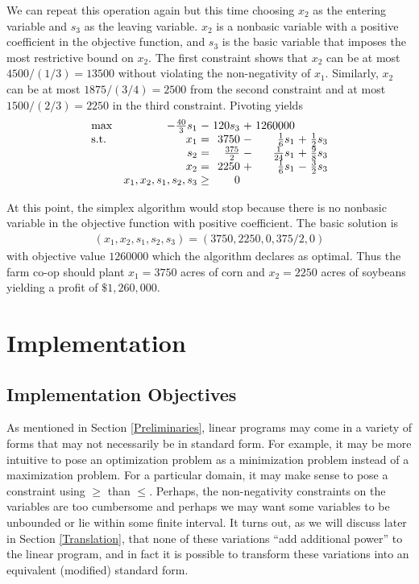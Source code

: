 \documentclass{article}
\begin{document}
We can repeat this operation again but this time choosing $x_2$ as the entering variable and $s_3$ as the leaving variable. $x_2$ is a nonbasic variable with a positive coefficient in the objective function, and $s_3$ is the basic variable that imposes the most restrictive bound on $x_2$. The first constraint shows that $x_2$ can be at most $4500 / (1/3) = 13500$ without violating the non-negativity of $x_1$. Similarly, $x_2$ can be at most $1875 / (3/4) = 2500$ from the second constraint and at most $1500 / (2/3) = 2250$ in the third constraint. Pivoting yields
\begin{equation*}
\setlength\arraycolsep{1.5pt}
  \begin{array}{l@{\quad} r c r c r c r}
    \max          & -\frac{40}{3}s_1 & - &         120 s_3 &    +  & 1260000    \\
    \mathrm{s.t.} & x_1 & = & 3750 & - & \frac{1}{6} s_1 & + & \frac{1}{2}s_3 \\
    & s_2 & = & \frac{375}{2} & - & \frac{1}{24}s_1 & + & \frac{9}{8} s_3 \\
    & x_2 & = & 2250 & + & \frac{1}{6}s_1 & - & \frac{3}{2}s_3 \\
    & x_1, x_2, s_1, s_2, s_3 & \geq & 0 &&&&  \\
  \end{array}
\end{equation*}

At this point, the simplex algorithm would stop because there is no nonbasic variable in the objective function with positive coefficient. The basic solution is
\begin{align*}
    (x_1, x_2, s_1, s_2, s_3) = (3750, 2250, 0, 375/2, 0)
\end{align*}
with objective value $1260000$ which the algorithm declares as optimal. Thus the farm co-op should plant $x_1 = 3750$ acres of corn and $x_2 = 2250$ acres of soybeans yielding a profit of $\$1,260,000$.

\section{Implementation} \label{Implementation}
\subsection{Implementation Objectives}
As mentioned in Section \ref{Preliminaries}, linear programs may come in a variety of forms that may not necessarily be in standard form. For example, it may be more intuitive to pose an optimization problem as a minimization problem instead of a maximization problem. For a particular domain, it may make sense to pose a constraint using $\geq$ than $\leq$. Perhaps, the non-negativity constraints on the variables are too cumbersome and perhaps we may want some variables to be unbounded or lie within some finite interval. It turns out, as we will discuss later in Section \ref{Translation}, that none of these variations ``add additional power'' to the linear program, and in fact it is possible to transform these variations into an equivalent (modified) standard form. 
\end{document}
